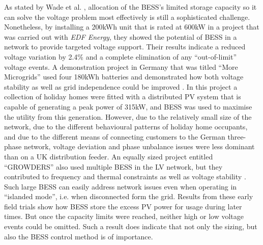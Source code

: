 As stated by Wade et al. \cite{Wade2009, Wade2010}, allocation of the BESS's limited storage capacity so it can solve the voltage problem most effectively is still a sophisticated challenge.
Nonetheless, by installing a 200kWh unit that is rated at 600kW in a project that was carried out with \textit{EDF Energy}, they showed the potential of BESS in a network to provide targeted voltage support.
Their results indicate a reduced voltage variation by 2.4\% and a complete elimination of any ``out-of-limit'' voltage events.
A demonstration project in Germany that was titled ``More Microgrids'' used four 180kWh batteries and demonstrated how both voltage stability as well as grid independence could be improved \cite{Overbeeke2010}.
In this project a collection of holiday homes were fitted with a distributed PV system that is capable of generating a peak power of 315kW, and BESS was used to maximise the utility from this generation.
However, due to the relatively small size of the network, due to the different behavioural patterns of holiday home occupants, and due to the different means of connecting customers to the German three-phase network, voltage deviation and phase unbalance issues were less dominant than on a UK distribution feeder.
An equally sized project entitled ``GROWDERS'' also used multiple BESS in the LV network, but they contributed to frequency and thermal constraints as well as voltage stability \cite{GROWDERS2011}.
Such large BESS can easily address network issues even when operating in ``islanded mode'', i.e. when disconnected form the grid.
Results from these early field trials show how BESS store the excess PV power for usage during later times.
But once the capacity limits were reached, neither high or low voltage events could be omitted.
Such a result does indicate that not only the sizing, but also the BESS control method is of importance.



